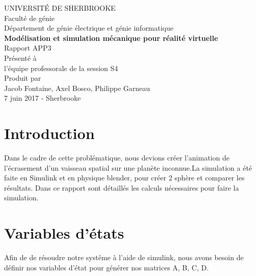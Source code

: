 \documentclass{article}
\begin{document}
\begin{titlepage}   
	\large{
		\begin{center}
			UNIVERSITÉ DE SHERBROOKE\\Faculté de génie\\
			Département de génie électrique et génie informatique\\
			\vspace{3cm}
			{\LARGE\textbf{Modélisation et simulation mécanique pour réalité virtuelle}}\\
			\vspace{2cm}
			\LARGE{Rapport APP3}\\
			\vspace{2cm}
			Présenté à\\l'équipe professorale de la session S4\\
			\vspace{2cm}
			Produit par\\Jacob Fontaine, Axel Bosco, Philippe Garneau\\
			\vspace{1cm}
			\vfill{7 juin 2017 - Sherbrooke}
		\end{center}
	}
\end{titlepage}
\newpage
\tableofcontents

\newpage
\section{Introduction}
Dans le cadre de cette problématique, nous devions créer l'animation de l'écrasement d'un vaisseau spatial sur une planète inconnue.La simulation a été faite en Simulink et en physique blender, pour créer 2 sphère et comparer les résultats. Dans ce rapport sont détaillés les calculs nécessaires pour faire la simulation. 

\section{Variables d'états}
Afin de de résoudre notre systême à l'aide de simulink, nous avons besoin de définir nos variables d'état pour générer nos matrices A, B, C, D.
\end{document}
